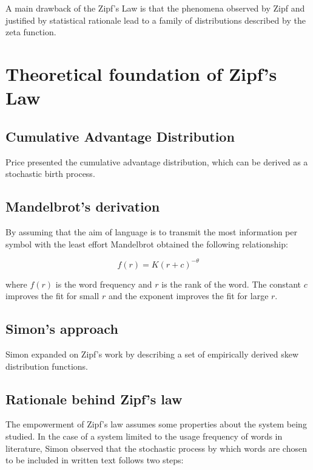 \documentclass{article} \usepackage{hyperref} \usepackage{graphicx}
\begin{document}
A main drawback of the Zipf's Law is that the phenomena observed by Zipf and
justified by statistical rationale lead to a family of distributions
described by the zeta function.

\section{Theoretical foundation of Zipf's Law}
\subsection{Cumulative Advantage Distribution}

Price presented the cumulative advantage distribution, which can be derived
as a stochastic birth process.

\subsection{Mandelbrot's derivation}

By assuming that the aim of language is to transmit the most information per
symbol with the least effort Mandelbrot obtained the following relationship:

\begin{equation}
  \label{simple_equation} f(r) = K(r+c)^{-\theta}
\end{equation}

where $f(r)$ is the word frequency and $r$ is the rank of the word. The
constant $c$ improves the fit for small $r$ and the exponent improves the
fit for large $r$.

\subsection{Simon's approach}

Simon expanded on Zipf's work by describing a set of empirically derived
skew distribution functions.

\subsection{Rationale behind Zipf's law}

The empowerment of Zipf's law assumes some properties about the system being
studied. In the case of a system limited to the usage frequency of words in
literature, Simon observed that the stochastic process by which words are
chosen to be included in written text follows two steps:
\end{document}
